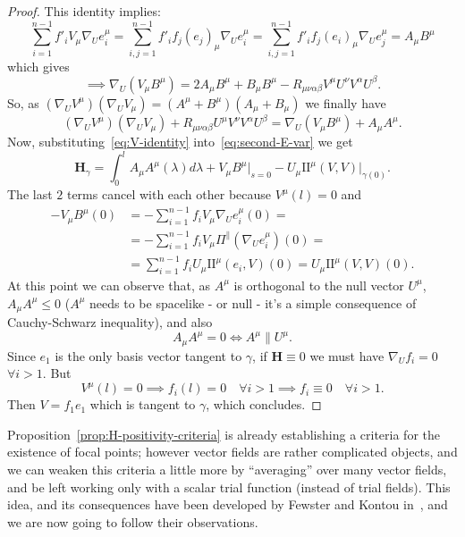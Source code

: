 \begin{proof}
	\noindent This identity implies:
	\[
	\sum_{i = 1}^{n - 1}f'_iV_{\mu}\nabla_Ue_i^{\mu} = \sum_{i, j = 1}^{n - 1}f'_if_j(e_j)_{\mu}\nabla_Ue_i^{\mu} = \sum_{i, j = 1}^{n - 1}f'_if_j(e_i)_{\mu}\nabla_Ue_j^{\mu} = A_{\mu}B^{\mu}
	\]
	which gives
	\[
	\implies \nabla_U(V_{\mu}B^{\mu}) = 2A_{\mu}B^{\mu} + B_{\mu}B^{\mu} - R_{\mu\nu\alpha\beta}V^{\mu}U^{\nu}V^{\alpha}U^{\beta}.
	\]
	So, as \((\nabla_UV^{\mu})(\nabla_UV_{\mu}) = (A^{\mu} + B^{\mu}) (A_{\mu} + B_{\mu})\) we finally have
	\begin{equation}
	\label{eq:V-identity}
		(\nabla_UV^{\mu})(\nabla_UV_{\mu}) + R_{\mu\nu\alpha\beta}U^{\mu}V^{\nu}V^{\alpha}U^{\beta} =  \nabla_U(V_{\mu}B^{\mu})  + A_{\mu}A^{\mu}.
	\end{equation}
	Now, substituting~\eqref{eq:V-identity} into~\eqref{eq:second-E-var} we get
	\[
	\textbf{H}_{\gamma} = \int_{0}^{l} A_{\mu}A^{\mu}(\lambda) d\lambda + V_{\mu}B^{\mu}\Big\vert_{s = 0} - U_{\mu}\mathrm{I\!I}^{\mu}(V, V)\vert_{\gamma(0)}.
	\]
	The last \(2\) terms cancel with each other because \(V^{\mu}(l) = 0\) and 
	\begin{align*}
		-V_{\mu}B^{\mu}(0) &= - \sum_{i = 1}^{n - 1}f_i V_{\mu}\nabla_Ue_i^{\mu}(0) =\\
		& = - \sum_{i = 1}^{n - 1}f_i V_{\mu}\Pi^{\parallel}\left(\nabla_Ue_i^{\mu}\right)(0) =\\
		& = \sum_{i = 1}^{n - 1}f_i U_{\mu}\mathrm{I\!I}^{\mu}(e_i, V)(0) = U_{\mu}\mathrm{I\!I}^{\mu}(V, V)(0).
	\end{align*}
	At this point we can observe that, as \(A^{\mu}\) is orthogonal to the null vector \(U^{\mu}\), \(A_{\mu}A^{\mu} \le 0\) (\(A^{\mu}\) needs to be spacelike - or null - it's a simple consequence of Cauchy-Schwarz inequality), and also
	\[
	A_{\mu}A^{\mu} = 0 \iff A^{\mu}\parallel U^{\mu}.
	\]
	Since \(e_1\) is the only basis vector tangent to \(\gamma\), if \(\textbf{H} \equiv 0\) we must have \(\nabla_Uf_i = 0\) \(\forall i > 1\). But
	\[
	V^{\mu}(l) = 0 \implies f_i(l) = 0 \quad \forall i > 1 \implies f_i\equiv 0 \quad \forall i > 1.
	\]
	Then \(V = f_1e_1\) which is tangent to \(\gamma\), which concludes.
\end{proof}

Proposition~\ref{prop:H-positivity-criteria} is already establishing a criteria for the existence of focal points; however vector fields are rather complicated objects, and we can weaken this criteria a little more by ``averaging'' over many vector fields, and be left working only with a scalar trial function (instead of trial fields). This idea, and its consequences have been developed by Fewster and Kontou in~\cite{fewster2020new}, and we are now going to follow their observations.


